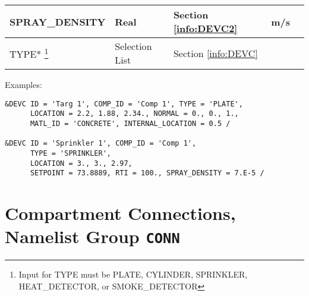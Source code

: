 \begin{minipage}{6.5in}
\begin{longtable}{@{\extracolsep{\fill}}|l|l|l|l|l|}
{\ct SPRAY\_DENSITY}      & Real        & Section \ref{info:DEVC2}    & m/s               &                 \\ \hline
{\ct TYPE}* \footnote{Input for {\ct TYPE} must be {\ct PLATE}, {\ct CYLINDER}, {\ct SPRINKLER}, {\ct HEAT\_DETECTOR}, or {\ct SMOKE\_DETECTOR}}
                          & Selection List   & Section \ref{info:DEVC}     &                   &                 \\ \hline
\end{longtable}
\end{minipage}


\vspace{\baselineskip}
\noindent Examples:
\begin{lstlisting}
&DEVC ID = 'Targ 1', COMP_ID = 'Comp 1', TYPE = 'PLATE',
      LOCATION = 2.2, 1.88, 2.34., NORMAL = 0., 0., 1.,
      MATL_ID = 'CONCRETE', INTERNAL_LOCATION = 0.5 /

&DEVC ID = 'Sprinkler 1', COMP_ID = 'Comp 1',
      TYPE = 'SPRINKLER',
      LOCATION = 3., 3., 2.97,
      SETPOINT = 73.8889, RTI = 100., SPRAY_DENSITY = 7.E-5 /
\end{lstlisting}



\clearpage
\section{Compartment Connections, Namelist Group \texorpdfstring{{\tt CONN}}{CONN}}

